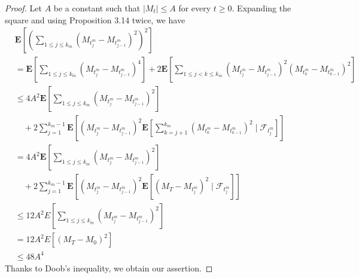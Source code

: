 \documentclass[twoside, 12pt]{book}
\numberwithin{equation}{chapter}
\def\bE{{\mathbf E}}
\def\geq{\geqslant}
\def\leq{\leqslant}
\begin{document}
\begin{proof}
		Let $A$ be a constant such that $\left|M_t\right| \leq A$ for every $t \geq 0$. Expanding the square and using Proposition 3.14 twice, we have
		\begin{align*}
			& \bE\left[\left(\sum_{1 \leq j \leq k_m}\left(M_{t_j^m}-M_{t_{j-1}^m}\right)^2\right)^2\right] \\
			& =\bE\left[\sum_{1 \leq j \leq k_m}\left(M_{t_j^m}-M_{t_{j-1}^m}\right)^4\right]+2 \bE\left[\sum_{1 \leq j<k \leq k_m}\left(M_{t_j^m}-M_{t_{j-1}^m}\right)^2\left(M_{t_k^m}-M_{t_{k-1}^m}\right)^2\right] \\
			& \leq 4 A^2 \bE\left[\sum_{1 \leq j \leq k_m}\left(M_{t_j^m}-M_{t_{j-1}^m}\right)^2\right] \\
			& \quad+2 \sum_{j=1}^{k_m-1} \bE\left[\left(M_{t_j^m}-M_{t_{j-1}^m}\right)^2 \bE\left[\sum_{k=j+1}^{k_m}\left(M_{t_k^m}-M_{t_{k-1}^m}\right)^2 \mid \mathscr{F}_{t_j^m}\right]\right] \\
			& =4 A^2 \bE\left[\sum_{1 \leq j \leq k_m}\left(M_{t_j^m}-M_{t_{j-1}^m}\right)^2\right] \\
			& \quad+2 \sum_{j=1}^{k_m-1} \bE\left[\left(M_{t_j^m}-M_{t_{j-1}^m}\right)^2 \bE\left[\left(M_T-M_{t_j^m}\right)^2 \mid \mathscr{F}_{t_j^m}\right]\right]\\
			& \leq 12 A^2 E\left[\sum_{1 \leq j \leq k_m}\left(M_{t_j^m}-M_{t_{j-1}^m}\right)^2\right] \\
			& =12 A^2 E\left[\left(M_T-M_0\right)^2\right] \\
			& \leq 48 A^4
		\end{align*}
		Thanks to Doob’s inequality, we obtain our assertion. 
	\end{proof}
	
\end{document}
